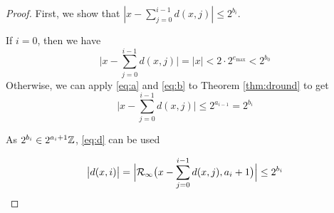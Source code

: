     \begin{proof}
      First, we show that $|x - \sum\limits_{j=0}^{i - 1}d(x,j)| \leq 2^{b_i}$.

      If $i = 0$, then we have
      \begin{equation*}
        \bigl|x - \sum\limits_{j=0}^{i - 1}d(x,j)\bigr| = |x| < 2 \cdot 2^{e_{\max}} < 2^{b_0}
      \end{equation*}
      Otherwise, we can apply  \eqref{eq:a} and \eqref{eq:b} to Theorem \ref{thm:dround} to get
      \begin{equation*}
        \bigl|x - \sum \limits_{j = 0}^{i - 1}d(x, j)\bigr| \leq 2^{a_{i - 1}} = 2^{b_i}
      \end{equation*}

      As $2^{b_i} \in 2^{a_i + 1}\mathbb{Z}$,  \eqref{eq:d} can be used

      \begin{equation*}
        \bigl|d(x, i)\bigr| = \Bigl|\mathcal{R}_\text{$\infty$}\bigl(x - \sum\limits_{j=0}^{i - 1}d(x,j), a_i + 1\bigr)\Bigr| \leq 2^{b_i}
      \end{equation*}
    \end{proof}

